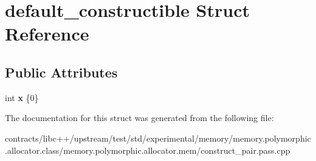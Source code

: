 \hypertarget{structdefault__constructible}{}\section{default\+\_\+constructible Struct Reference}
\label{structdefault__constructible}
\subsection*{Public Attributes}
\begin{DoxyCompactItemize}
\item 
\mbox{\label{structdefault__constructible_a69c8f98f869ae006919cc9371f278b43}} 
int {\bfseries x} \{0\}
\end{DoxyCompactItemize}


The documentation for this struct was generated from the following file\+:\begin{DoxyCompactItemize}
\item 
contracts/libc++/upstream/test/std/experimental/memory/memory.\+polymorphic.\+allocator.\+class/memory.\+polymorphic.\+allocator.\+mem/construct\+\_\+pair.\+pass.\+cpp\end{DoxyCompactItemize}
